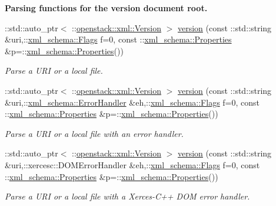 \begin{Indent}{\bf Parsing functions for the version document root.}\par
\begin{DoxyCompactItemize}
\item 
::std::auto\_\-ptr$<$ ::\hyperlink{classopenstack_1_1xml_1_1Version}{openstack::xml::Version} $>$ \hyperlink{namespaceopenstack_1_1xml_acabe571be97ab931700903750e0bccf9}{version} (const ::std::string \&uri,::\hyperlink{namespacexml__schema_affb4c227cbd9aa7453dd1dc5a1401943}{xml\_\-schema::Flags} f=0, const ::\hyperlink{namespacexml__schema_ad27ce19a7ee1d3b1064092648898f64c}{xml\_\-schema::Properties} \&p=::\hyperlink{namespacexml__schema_ad27ce19a7ee1d3b1064092648898f64c}{xml\_\-schema::Properties}())
\begin{DoxyCompactList}\small\item\em Parse a URI or a local file. \item\end{DoxyCompactList}\item 
::std::auto\_\-ptr$<$ ::\hyperlink{classopenstack_1_1xml_1_1Version}{openstack::xml::Version} $>$ \hyperlink{namespaceopenstack_1_1xml_abc5a8dd0cbb67912d8135c08a2e7e440}{version} (const ::std::string \&uri,::\hyperlink{namespacexml__schema_ab1c9361bfd3b404eaabf0c31eded79dc}{xml\_\-schema::ErrorHandler} \&eh,::\hyperlink{namespacexml__schema_affb4c227cbd9aa7453dd1dc5a1401943}{xml\_\-schema::Flags} f=0, const ::\hyperlink{namespacexml__schema_ad27ce19a7ee1d3b1064092648898f64c}{xml\_\-schema::Properties} \&p=::\hyperlink{namespacexml__schema_ad27ce19a7ee1d3b1064092648898f64c}{xml\_\-schema::Properties}())
\begin{DoxyCompactList}\small\item\em Parse a URI or a local file with an error handler. \item\end{DoxyCompactList}\item 
::std::auto\_\-ptr$<$ ::\hyperlink{classopenstack_1_1xml_1_1Version}{openstack::xml::Version} $>$ \hyperlink{namespaceopenstack_1_1xml_a2c7384f794cc90f72265a9f446a87b37}{version} (const ::std::string \&uri,::xercesc::DOMErrorHandler \&eh,::\hyperlink{namespacexml__schema_affb4c227cbd9aa7453dd1dc5a1401943}{xml\_\-schema::Flags} f=0, const ::\hyperlink{namespacexml__schema_ad27ce19a7ee1d3b1064092648898f64c}{xml\_\-schema::Properties} \&p=::\hyperlink{namespacexml__schema_ad27ce19a7ee1d3b1064092648898f64c}{xml\_\-schema::Properties}())
\begin{DoxyCompactList}\small\item\em Parse a URI or a local file with a Xerces-\/C++ DOM error handler. \item\end{DoxyCompactList}\item 

\end{DoxyCompactItemize}
\end{Indent}
